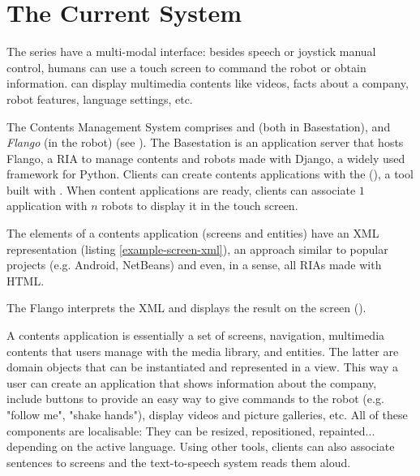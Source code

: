 \section{The Current System}
The  series have a multi-modal interface: besides speech or joystick manual control, humans can use a touch screen to command the robot or obtain information.
 can display multimedia contents like videos, facts about a company, robot features, language settings, etc.

The Contents Management System comprises \emph{\flangofe} and \emph{\flangobe} (both in Basestation), and \emph{Flango \cm} (in the robot) (see ).
The Basestation is an application server that hosts Flango, a \ac{RIA} to manage contents and robots made with Django, a widely used framework for Python. 
Clients can create contents applications  with the \flangofe (\se), a tool built with \flash .
When content applications are ready, clients can associate $1$ application with $n$ robots to display it in the touch screen.



The elements of a contents application (screens and entities) have an \ac{XML} representation (listing \ref{example-screen-xml}), an approach similar to popular projects (e.g. Android, NetBeans) and even, in a sense, all \acp{RIA} made with \ac{HTML}.

The Flango \cm interprets the \ac{XML} and displays the result on the screen ().

A contents application is essentially a set of screens, navigation, multimedia contents that users manage with the media library, and entities. 
The latter are domain objects that can be instantiated and represented in a view. 
This way a user can create an application that shows information about the company, include buttons to provide an easy way to give commands to the robot (e.g. "follow me", "shake hands"), display videos and picture galleries, etc.
All of these components are localisable:  
They can be resized, repositioned, repainted... depending on the active language.
Using other tools, clients can also associate sentences to screens and the text-to-speech system reads them aloud.

